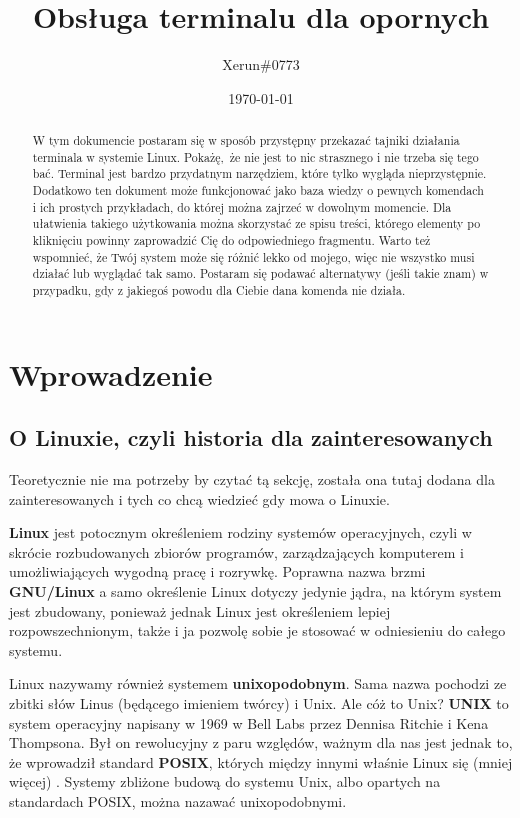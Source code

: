 \documentclass[12pt]{article}
\title{Obsługa terminalu dla opornych}
\author{Xerun\#0773}
\date{\today}
\begin{document}
\begin{titlepage}
    \maketitle
\end{titlepage}

\begin{abstract}
    W tym dokumencie postaram się w sposób przystępny przekazać tajniki działania terminala w systemie Linux. Pokażę, że nie jest to nic strasznego i nie trzeba się tego bać. Terminal jest bardzo przydatnym narzędziem, które tylko wygląda nieprzystępnie. Dodatkowo ten dokument może funkcjonować jako baza wiedzy o pewnych komendach i ich prostych przykładach, do której można zajrzeć w dowolnym momencie. Dla ułatwienia takiego użytkowania można skorzystać ze spisu treści, którego elementy po kliknięciu powinny zaprowadzić Cię do odpowiedniego fragmentu. Warto też wspomnieć, że Twój system może się różnić lekko od mojego, więc nie wszystko musi działać lub wyglądać tak samo. Postaram się podawać alternatywy (jeśli takie znam) w przypadku, gdy z jakiegoś powodu dla Ciebie dana komenda nie działa.
\end{abstract}
\newpage
{\hypersetup{hidelinks}\tableofcontents}
\newpage
\section{Wprowadzenie}
\subsection{O Linuxie, czyli historia dla zainteresowanych}

Teoretycznie nie ma potrzeby by czytać tą sekcję, została ona tutaj dodana dla zainteresowanych i tych co chcą wiedzieć  gdy mowa o Linuxie.

\textbf{Linux} jest potocznym określeniem rodziny systemów operacyjnych, czyli w skrócie rozbudowanych zbiorów programów, zarządzających komputerem i umożliwiających wygodną pracę i rozrywkę. Poprawna nazwa brzmi \textbf{GNU/Linux} a samo określenie Linux dotyczy jedynie jądra, na którym system jest zbudowany, ponieważ jednak Linux jest określeniem lepiej rozpowszechnionym, także i ja pozwolę sobie je stosować w odniesieniu do całego systemu.

Linux nazywamy również systemem \textbf{unixopodobnym}. Sama nazwa pochodzi ze zbitki słów Linus (będącego imieniem twórcy) i Unix. Ale cóż to Unix? \textbf{UNIX} to system operacyjny napisany w 1969 w Bell Labs przez Dennisa Ritchie i Kena Thompsona. Był on rewolucyjny z paru względów, ważnym dla nas jest jednak to, że wprowadził standard \textbf{POSIX}, których między innymi właśnie Linux się (mniej więcej) . Systemy zbliżone budową do systemu Unix, albo opartych na standardach POSIX, można nazawać unixopodobnymi.
\end{document}
